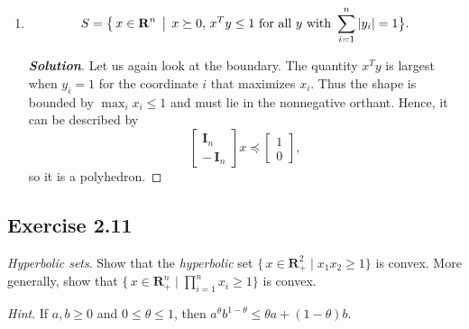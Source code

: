 \documentclass[12pt]{article}
\newenvironment{Solution}
  {\begin{proof}[\textbf{Solution}]}
  {\end{proof}}
\begin{document}
\begin{enumerate}[label=(\alph*)]
	      \begin{Solution}
		      The term \(x^T y\) is the dot product with a unit vector. Since \(x\) is chosen arbitrarily, we can set
		      \(\displaystyle y = \frac{x}{\|x\|_2}\)
		      to examine the boundary of the set, which gives
		      \[
			      \|x\|_2 \,\leq\, 1.
		      \]
		      Along with \(x \succeq 0\), this describes a portion of the \(n\)-dimensional sphere lying in the nonnegative orthant. Hence, it is not a polyhedron.
	      \end{Solution}

	\item
	      \[
		      S
		      =
		      \bigl\{\,
		      x \in \mathbf{R}^n
		      \,\bigm|\,
		      x \succeq 0,\,
		      x^T y \leq 1
		      \text{ for all }y\text{ with }
		      \sum_{i=1}^n |y_i| = 1
		      \bigr\}.
	      \]

	      \begin{Solution}
		      Let us again look at the boundary. The quantity \(x^T y\) is largest when \(y_i = 1\) for the coordinate \(i\) that maximizes \(x_i\). Thus the shape is bounded by
		      \(\max_i x_i \leq 1\)
		      and must lie in the nonnegative orthant.
		      Hence, it can be described by
		      \[
			      \begin{bmatrix}
				      \mathbf{I}_n \\
				      -\,\mathbf{I}_n
			      \end{bmatrix}
			      x
			      \preceq
			      \begin{bmatrix}
				      1 \\[3pt]
				      0
			      \end{bmatrix},
		      \]
		      so it is a polyhedron.
	      \end{Solution}

\end{enumerate}


\vspace{0.15in}

\subsection*{Exercise 2.11}
\textit{Hyperbolic sets}. Show that the \textit{hyperbolic} set 
\(\{\, x \in \mathbf{R}^2_+ \mid x_1 x_2 \geq 1\}\)
is convex. More generally, show that 
\(\{\, x \in \mathbf{R}^n_+ \mid \prod_{i=1}^n x_i \geq 1 \}\)
is convex. 

\textit{Hint}. If \(a,b \geq 0\) and \(0 \leq \theta \leq 1\), then 
\(a^{\theta} b^{1-\theta} \leq \theta a + (1 - \theta)b\).
\end{document}
